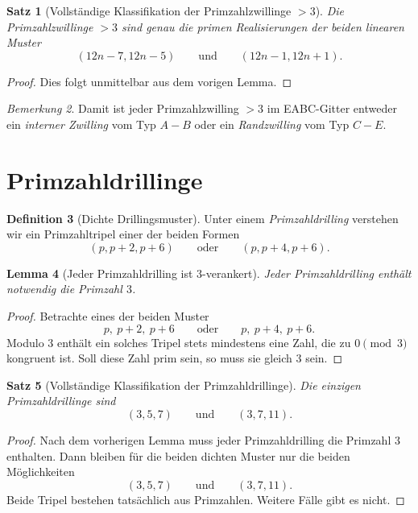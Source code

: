 \documentclass[11pt,a4paper]{article}
\newtheorem{satz}{Satz}
\newtheorem{lemma}[satz]{Lemma}
\theoremstyle{definition}
\newtheorem{definition}[satz]{Definition}
\theoremstyle{remark}
\newtheorem{bemerkung}[satz]{Bemerkung}
\begin{document}
	\begin{satz}[Vollständige Klassifikation der Primzahlzwillinge \(>3\)]
		Die Primzahlzwillinge \(>3\) sind genau die primen Realisierungen der beiden linearen Muster
		\[
		(12n-7,12n-5)
		\qquad\text{und}\qquad
		(12n-1,12n+1).
		\]
	\end{satz}
	
	\begin{proof}
		Dies folgt unmittelbar aus dem vorigen Lemma.
	\end{proof}
	
	\begin{bemerkung}
		Damit ist jeder Primzahlzwilling \(>3\) im EABC-Gitter entweder ein
		\emph{interner Zwilling} vom Typ \(A\!-\!B\) oder ein \emph{Randzwilling} vom Typ \(C\!-\!E\).
	\end{bemerkung}
	
	\section{Primzahldrillinge}
	
	\begin{definition}[Dichte Drillingsmuster]
		Unter einem \emph{Primzahldrilling} verstehen wir ein Primzahltripel einer der beiden Formen
		\[
		(p,p+2,p+6)
		\qquad\text{oder}\qquad
		(p,p+4,p+6).
		\]
	\end{definition}
	
	\begin{lemma}[Jeder Primzahldrilling ist \(3\)-verankert]
		Jeder Primzahldrilling enthält notwendig die Primzahl \(3\).
	\end{lemma}
	
	\begin{proof}
		Betrachte eines der beiden Muster
		\[
		p,\ p+2,\ p+6
		\qquad\text{oder}\qquad
		p,\ p+4,\ p+6.
		\]
		Modulo \(3\) enthält ein solches Tripel stets mindestens eine Zahl, die zu \(0\pmod 3\)
		kongruent ist. Soll diese Zahl prim sein, so muss sie gleich \(3\) sein.
	\end{proof}
	
	\begin{satz}[Vollständige Klassifikation der Primzahldrillinge]
		Die einzigen Primzahldrillinge sind
		\[
		(3,5,7)
		\qquad\text{und}\qquad
		(3,7,11).
		\]
	\end{satz}
	
	\begin{proof}
		Nach dem vorherigen Lemma muss jeder Primzahldrilling die Primzahl \(3\) enthalten.
		Dann bleiben für die beiden dichten Muster nur die beiden Möglichkeiten
		\[
		(3,5,7)
		\qquad\text{und}\qquad
		(3,7,11).
		\]
		Beide Tripel bestehen tatsächlich aus Primzahlen. Weitere Fälle gibt es nicht.
	\end{proof}
	
\end{document}
